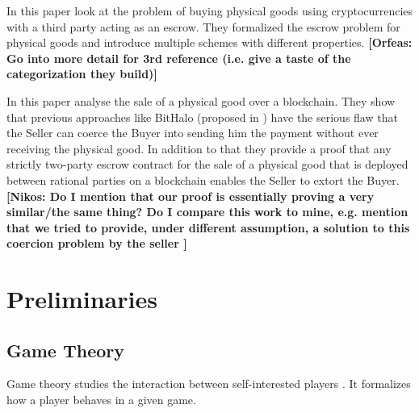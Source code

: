 \documentclass{cacthesis}
\newcommand{\authnote}[3]{{ \footnotesize \textbf{#1[#2: #3]~}}}
\newcommand{\orfnote}[1]{\authnote{\color{blue}}{Orfeas}{#1}}
\newcommand{\niknote}[1]{\authnote{\color{red}}{Nikos}{#1}}
\begin{document}
In this paper \citeauthor{kiayias_escrow_2017} look at the problem of buying physical goods using cryptocurrencies with a third party acting as an escrow. They formalized the escrow problem for physical goods and introduce multiple schemes with different properties.\orfnote{Go into more detail for 3rd reference (i.e. give a taste of the categorization they build)}\newline

In this paper \citeauthor{goharshady_irrationality_2021} analyse the sale of a physical good over a blockchain. They show that previous approaches like BitHalo (proposed in \cite{zimbeck_two_nodate}) have the serious flaw that the Seller can coerce the Buyer into sending him the payment without ever receiving the physical good. In addition to that they provide a proof that any strictly two-party escrow contract for the sale of a physical good that is deployed between rational parties on a blockchain enables the Seller to extort the Buyer. 
\niknote{Do I mention that our proof is essentially proving a very similar/the same thing? Do I compare this work to mine, e.g. mention that we tried to provide, under different assumption, a solution to this coercion problem by the seller }
\chapter{Preliminaries}
\label{cha:preliminaries}

\section{Game Theory}
Game theory studies the interaction between self-interested players \cite{leyton-brown_essentials_2008}. It formalizes how a player behaves in a given game.
\end{document}
